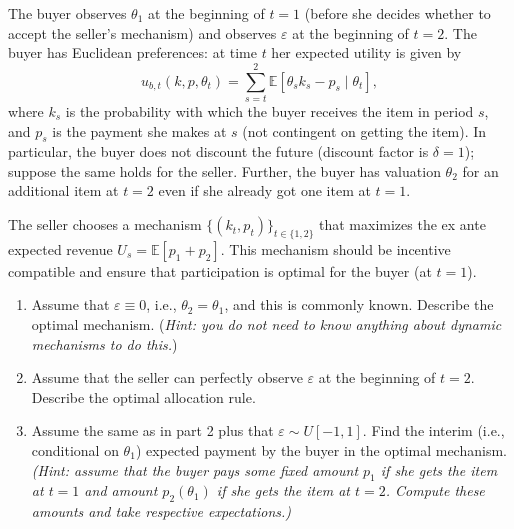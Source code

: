 \documentclass[a4paper]{article}
\newif\ifsolutions
\begin{document}
	The buyer observes $\theta_1$ at the beginning of $t=1$ (before she decides whether to accept the seller's mechanism) and observes $\varepsilon$ at the beginning of $t=2$. The buyer has Euclidean preferences: at time $t$ her expected utility is given by
	\begin{equation*}
		u_{b,t} (k,p,\theta_t) = \sum_{s=t}^2 \mathbb{E} \left[ \theta_s k_s - p_s \mid \theta_t \right],
	\end{equation*}
	where $k_s$ is the probability with which the buyer receives the item in period $s$, and $p_s$ is the payment she makes at $s$ (not contingent on getting the item). In particular, the buyer does not discount the future (discount factor is $\delta=1$); suppose the same holds for the seller. Further, the buyer has valuation $\theta_2$ for an additional item at $t=2$ even if she already got one item at $t=1$.
	
	The seller chooses a mechanism $\{(k_t,p_t)\}_{t \in \{1,2\}}$ that maximizes the ex ante expected revenue $U_s = \mathbb{E} \left[ p_1 + p_2 \right]$. This mechanism should be incentive compatible and ensure that participation is optimal for the buyer (at $t=1$).
	
	\begin{enumerate}
		\item %
		Assume that $\varepsilon \equiv 0$, i.e., $\theta_2 = \theta_1$, and this is commonly known. Describe the optimal mechanism. (\emph{Hint: you do not need to know anything about dynamic mechanisms to do this.})
		\item %
		Assume that the seller can perfectly observe $\varepsilon$ at the beginning of $t=2$. Describe the optimal allocation rule.
		\item %
		Assume the same as in part 2 plus that $\varepsilon \sim U[-1,1]$. Find the interim (i.e., conditional on $\theta_1$) expected payment by the buyer in the optimal mechanism.
		\emph{(Hint: assume that the buyer pays some fixed amount $p_1$ if she gets the item at $t=1$ and amount $p_2(\theta_1)$ if she gets the item at $t=2$. Compute these amounts and take respective expectations.)}
	\end{enumerate}


\ifsolutions
\end{document}
